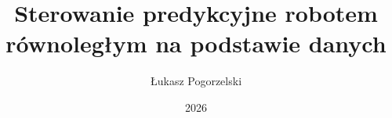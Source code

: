 \documentclass[thesis=inz,faculty=mel]{EE-dyplom}
\title{Sterowanie predykcyjne robotem równoległym na podstawie danych}
\author{Łukasz Pogorzelski}
\date{2026}
\begin{document}
    

	
    
    
    
    

    \bibliografia

    
    \listoffigures
    \listoftables
    \easyappendices
\end{document}
